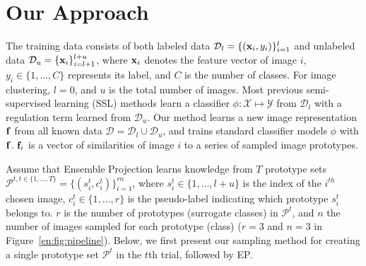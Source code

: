 

\section{Our Approach}
\label{en:sec:approach}


The training data consists of both labeled data $\mathcal{D}_l =
\{(\bold{x}_i, y_i)\}_{i=1}^{l}$ and unlabeled data $\mathcal{D}_u =
\{\bold{x}_i\}_{i=l+1}^{l+u}$, where $\bold{x}_i$ denotes the feature
vector of image $i$, $y_i \in\{1, ..., C\}$ represents its label, and
$C$ is the number of classes. For image clustering, $l=0$, and
$u$ is the total number of images.  Most previous semi-supervised
learning (SSL) methods learn a classifier $\phi: \mathcal{X} \mapsto
\mathcal{Y}$ from $\mathcal{D}_l$ with a regulation term learned from
$\mathcal{D}_u$. Our method learns a new image representation
$\bold{f}$ from all known data $\mathcal{D} = \mathcal{D}_l \cup
\mathcal{D}_u$, and trains standard classifier models $\phi$ with
$\bold{f}$.  $\bold{f}_i$ is a vector of similarities of image $i$ to
a series of sampled image prototypes.

Assume that Ensemble Projection learns knowledge from $T$
prototype sets $\mathcal{P}^{t, t\in \{1, ..., T \}}=\{(s_i^t,
c_i^t)\}_{i=1}^{rn}$, where $s_i^t \in \{1, ..., l+u \}$ is the index
of the $i^{th}$ chosen image, $c_i^t \in \{1, ..., r\}$ is the
pseudo-label indicating which prototype $s_i^t$ belongs to.  $r$ is the
number of prototypes (surrogate classes) in
$\mathcal{P}^t$, and $n$ the number of images sampled for each
prototype (class) (\eg $r=3$ and $n=3$ in Figure~\ref{en:fig:pipeline}).
Below, we first present our sampling method for creating a single
prototype set $\mathcal{P}^t$ in the $t$th trial, followed by EP.


